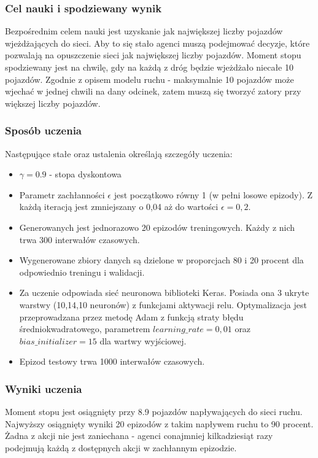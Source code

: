 \documentclass[12pt]{book}
\theoremstyle{plain}
\begin{document}
\subsubsection*{Cel nauki i spodziewany wynik}
Bezpośrednim celem nauki jest uzyskanie jak największej liczby pojazdów wjeżdżających do sieci. Aby to się stało agenci muszą podejmować decyzje, które pozwalają na opuszczenie sieci jak największej liczby pojazdów. Moment stopu spodziewany jest na chwilę, gdy na każdą z dróg będzie wjeżdżało niecałe 10 pojazdów. Zgodnie z opisem modelu ruchu - maksymalnie 10 pojazdów może wjechać w jednej chwili na dany odcinek, zatem muszą się tworzyć zatory przy większej liczby pojazdów.

\subsubsection*{Sposób uczenia}
Następujące stałe oraz ustalenia określają szczegóły uczenia:
\begin{itemize}
	\item $\gamma = 0.9$ - stopa dyskontowa
	\item Parametr zachłanności $\epsilon$ jest początkowo równy 1 (w pełni losowe epizody). Z każdą iteracją jest zmniejszany o 0,04 aż do wartości $\epsilon=0,2$.
	\item Generowanych jest jednorazowo 20 epizodów treningowych. Każdy z nich trwa 300 interwałów czasowych.
	\item Wygenerowane zbiory danych są dzielone w proporcjach 80 i 20 procent dla odpowiednio treningu i walidacji.
	\item Za uczenie odpowiada sieć neuronowa biblioteki Keras. Posiada ona 3 ukryte warstwy (10,14,10 neuronów) z funkcjami aktywacji relu. Optymalizacja jest przeprowadzana przez metodę Adam z funkcją straty błędu średniokwadratowego, parametrem $learning\_rate = 0,01$ oraz $bias\_initializer=15$ dla wartwy wyjściowej. 
	\item Epizod testowy trwa 1000 interwałów czasowych.
\end{itemize}
\subsubsection{Wyniki uczenia}
Moment stopu jest osiągnięty przy 8.9 pojazdów napływających do sieci ruchu. Najwyższy osiągnięty wyniki 20 epizodów z takim napływem ruchu to 90 procent. Żadna z akcji nie jest zaniechana - agenci conajmniej kilkadziesiąt razy podejmują każdą z dostępnych akcji w zachłannym epizodzie.
\end{document}
